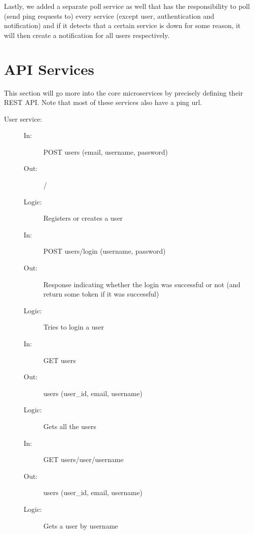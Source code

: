\documentclass{article}
\begin{document}
Lastly, we added a separate poll service as well that has the responsibility to poll (send ping requests to) every service (except user, authentication and notification) and if it detects that a certain service is down for some reason, it will then create a notification for all users respectively.

\section{API Services}
\label{api}

This section will go more into the core microservices by precisely defining their REST API. Note that most of these services also have a ping url.

\begin{description}
    \item [User service:]
    \begin{description}
        \item[]
        \item[In:] POST users (email, username, password)
        \item[Out:] /
        \item[Logic:] Registers or creates a user
        \item[]
    \end{description}
    \begin{description}
        \item[In:] POST users/login (username, password)
        \item[Out:] Response indicating whether the login was successful or not (and return some token if it was successful)
        \item[Logic:] Tries to login a user
        \item[]
    \end{description}
    \begin{description}
        \item[In:] GET users
        \item[Out:] users (user\_id, email, username)
        \item[Logic:] Gets all the users
        \item[]
    \end{description}
    \begin{description}
        \item[In:] GET users/user/username
        \item[Out:] users (user\_id, email, username)
        \item[Logic:] Gets a user by username

\end{description}
\end{description}
\end{document}
